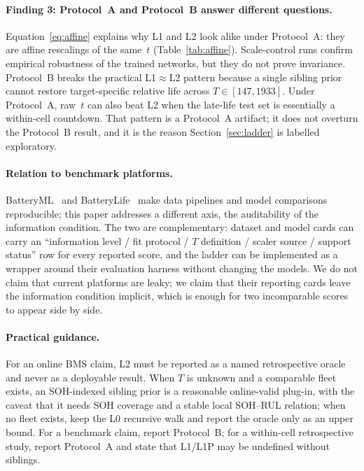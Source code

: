 \paragraph{Finding 3: Protocol~A and Protocol~B answer different questions.}
Equation~\eqref{eq:affine} explains why L1 and L2 look alike under Protocol~A: they are affine rescalings of the same~$t$ (Table~\ref{tab:affine}).
Scale-control runs confirm empirical robustness of the trained networks, but they do not prove invariance.
Protocol~B breaks the practical L1$\approx$L2 pattern because a single sibling prior cannot restore target-specific relative life across $T\in[147,1933]$.
Under Protocol~A, raw~$t$ can also beat L2 when the late-life test set is essentially a within-cell countdown.
That pattern is a Protocol~A artifact; it does not overturn the Protocol~B result, and it is the reason Section~\ref{sec:ladder} is labelled exploratory.

\paragraph{Relation to benchmark platforms.}
BatteryML~\cite{zhang2024batteryml} and BatteryLife~\cite{tan2025batterylife} make data pipelines and model comparisons reproducible; this paper addresses a different axis, the auditability of the information condition.
The two are complementary: dataset and model cards can carry an “information level / fit protocol / $T$ definition / scaler source / support status” row for every reported score, and the ladder can be implemented as a wrapper around their evaluation harness without changing the models.
We do not claim that current platforms are leaky; we claim that their reporting cards leave the information condition implicit, which is enough for two incomparable scores to appear side by side.

\paragraph{Practical guidance.}
For an online BMS claim, L2 must be reported as a named retrospective oracle and never as a deployable result.
When $T$ is unknown and a comparable fleet exists, an SOH-indexed sibling prior is a reasonable online-valid plug-in, with the caveat that it needs SOH coverage and a stable local SOH--RUL relation; when no fleet exists, keep the L0 recursive walk and report the oracle only as an upper bound.
For a benchmark claim, report Protocol~B; for a within-cell retrospective study, report Protocol~A and state that L1/L1P may be undefined without siblings.

